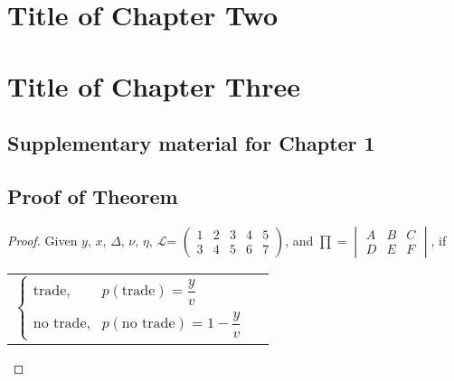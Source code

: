 \documentclass[letterpaper]{report}
\begin{document}
\chapter{Title of Chapter Two}


\chapter{Title of Chapter Three}


\onehalfspacing


\begin{appendices}
  \doublespacing
  
  \chapter{Supplementary material for  Chapter 1}
  
  \section{Proof of Theorem}
  
  \begin{proof} 
    
    Given $y$, $x$, $\Delta$, $\nu$, $\eta$, $\mathcal{L}$=
    $\begin{pmatrix}
    1 & 2 & 3 & 4 & 5 \\
    3 & 4 & 5 & 6 & 7
    \end{pmatrix}$,
    and $\prod=\begin{vmatrix}
    A &B  &C \\
    D&  E& F
    \end{vmatrix}$, if
    
    \begin{center}
      \begin{tabular}{ll}
        $\begin{cases}
        \text{trade}, & p(\text{trade})=\dfrac{y}{v}\\
        \text{no trade}, & p(\text{no trade})=1-\dfrac{y}{v}
        \end{cases}$
      \end{tabular}
    \end{center}
    

\end{proof}
\end{appendices}
\end{document}
